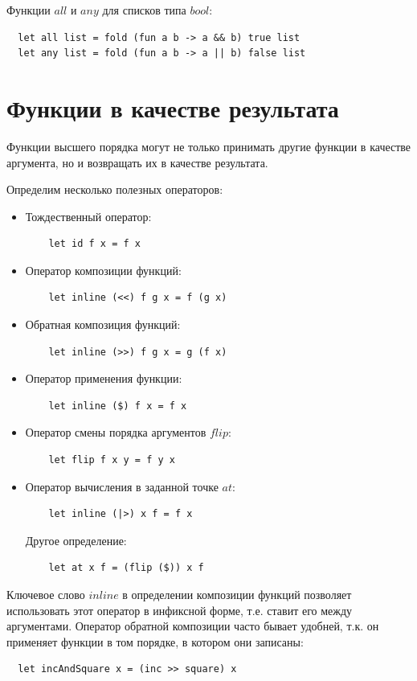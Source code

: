 \documentclass[a4paper,11pt]{article}
\begin{document}
Функции $all$ и $any$ для списков типа $bool$:
\begin{lstlisting}
  let all list = fold (fun a b -> a && b) true list
  let any list = fold (fun a b -> a || b) false list
\end{lstlisting}

\section{Функции в качестве результата}
Функции высшего порядка могут не только принимать другие функции в качестве
аргумента, но и возвращать их в качестве результата.

Определим несколько полезных операторов:
\begin{itemize}
\item Тождественный оператор:
  \begin{lstlisting}
    let id f x = f x
  \end{lstlisting}
\item Оператор композиции функций:
  \begin{lstlisting}
    let inline (<<) f g x = f (g x)
  \end{lstlisting}
\item Обратная композиция функций:
  \begin{lstlisting}
    let inline (>>) f g x = g (f x)
  \end{lstlisting}
\item Оператор применения функции:
  \begin{lstlisting}
    let inline ($) f x = f x
  \end{lstlisting}
\item Оператор смены порядка аргументов $flip$:
  \begin{lstlisting}
    let flip f x y = f y x
  \end{lstlisting}
\item Оператор вычисления в заданной точке $at$:
  \begin{lstlisting}
    let inline (|>) x f = f x
  \end{lstlisting}
  Другое определение:
  \begin{lstlisting}
    let at x f = (flip ($)) x f
  \end{lstlisting}
\end{itemize}

Ключевое слово $inline$ в определении композиции функций позволяет использовать
этот оператор в инфиксной форме, т.е. ставит его между аргументами. Оператор
обратной композиции часто бывает удобней, т.к. он применяет функции в том порядке,
в котором они записаны:
\begin{lstlisting}
  let incAndSquare x = (inc >> square) x
\end{lstlisting}
\end{document}
